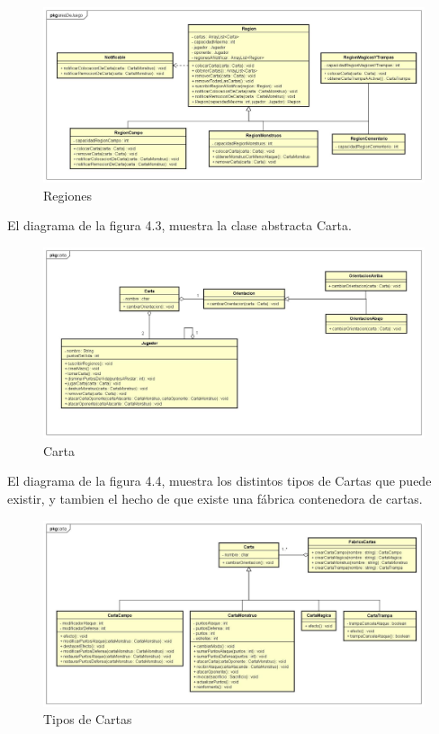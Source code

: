 \begin{figure}[H]
	\centering
	\includegraphics[scale=0.3]{includes/areaDeJuego}
	\caption{Regiones}
	\label{areaDeJuego}
\end{figure}

El diagrama de la figura 4.3, muestra la clase abstracta Carta.

\begin{figure}[H]
	\centering
	\includegraphics[scale=0.3]{includes/Carta}
	\caption{Carta}
	\label{Cartas}
\end{figure}

El diagrama de la figura 4.4, muestra los distintos tipos de Cartas que puede existir, y tambien el hecho de que existe una fábrica contenedora de cartas.

\begin{figure}[H]
	\centering
	\includegraphics[scale=0.3]{includes/Carta2}
	\caption{Tipos de Cartas}
	\label{TiposCarta}
\end{figure}

